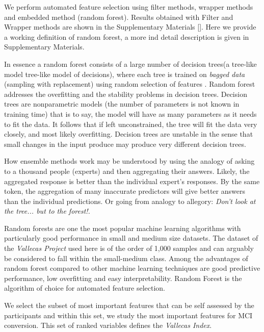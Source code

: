 \documentclass[preprint,12pt]{elsarticle}
\begin{document}
We perform automated feature selection using filter methods, wrapper methods and embedded method (random forest). Results obtained with Filter and Wrapper methods are shown in the Supplementary Materials \ref{}. 
Here we provide a working definition of random forest, a more ind detail description is given in Supplementary Materials.

In essence a random forest consists of a large number of decision trees(a tree-like model tree-like model of decisions), where each tree is trained on \emph{bagged data} (sampling with replacement) using random selection of features \cite{trevor2009elements}. 
Random forest addresses the overfitting and the stability problems in decision trees. Decision trees are nonparametric models (the number of parameters is not known in training time) that is to say, the model will have as many parameters as it needs to fit the data. It follows that if left unconstrained, the tree will fit the data very closely, and most likely overfitting. Decision trees are unstable in the sense that small changes in the input produce may produce very different decision trees. 

How ensemble methods work may be understood by using the analogy of asking to a thousand people (experts) and then aggregating their answers. Likely, the aggregated response is better than the individual expert’s responses. By the same token, the aggregation of many inaccurate predictors will give better answers than the individual predictions. Or going from analogy to allegory: \emph{Don’t look at the tree... but to the forest!. }

Random forests are one the most popular machine learning algorithms with particularly good performance in small and medium size datasets. The dataset of the \emph{Vallecas Project} used here is of the order of 1,000 samples and can arguably be considered to fall within the small-medium class.
Among the advantages of random forest compared to other machine learning techniques are good predictive performance, low overfitting and easy interpretability. Random Forest is the algorithm of choice for automated feature selection.

We select the subset of most important features that can be self assessed by the participants and within this set, we study the most important features for MCI conversion. This set of ranked variables defines the \emph{Vallecas Index}. 
\end{document}
